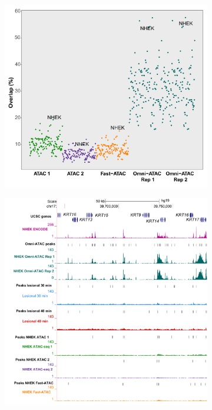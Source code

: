 \begin{figure}[htbp]
\centering
\begin{subfigure}{0.5\textwidth}
\centering
\includegraphics[width=\textwidth]{./Results1/pdfs/ENCODE_125_cell_types_overlap_FAST_ATAC_Omni_ATAC_pval_2}
\caption{\textbf{}}
\end{subfigure}
\begin{subfigure}{0.5\textwidth}
\centering
\includegraphics[width=\textwidth]{./Results1/pdfs/ATAC_skin_all_tracks_KRT}

\end{subfigure}
\end{figure}
